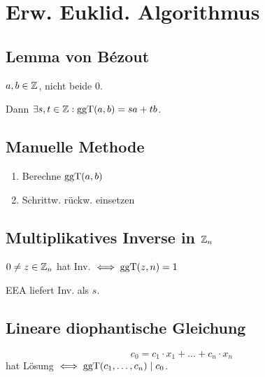 \section*{Erw. Euklid. Algorithmus}

\subsection*{Lemma von B\'ezout}
$a,b\in\mathbb{Z}$, nicht beide 0.

Dann $\exists s,t\in\mathbb{Z}: \operatorname{ggT}(a,b)=sa + tb$.

\subsection*{Manuelle Methode}
\begin{enumerate}
	\item Berechne $\operatorname{ggT}(a,b)$
	\item Schrittw. rückw. einsetzen
\end{enumerate}

\subsection*{Multiplikatives Inverse in $\mathbb{Z}_n$}
$0\neq z \in \mathbb{Z}_n$ hat Inv. $\iff \operatorname{ggT}(z,n)=1$

EEA liefert Inv. als $s$.

\subsection*{Lineare diophantische Gleichung}
\[c_0 = c_1\cdot x_1 + \ldots + c_n \cdot x_n\]
hat Lösung $\iff \operatorname{ggT}(c_1,\ldots,c_n) \mid c_0$.
